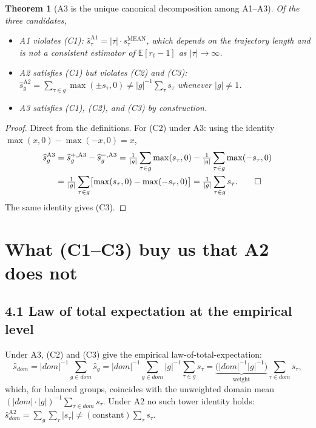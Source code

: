 \documentclass[11pt]{article}
\newcommand{\smean}{s^{\text{MEAN}}}
\newtheorem{theorem}{Theorem}
\begin{document}
\begin{theorem}[A3 is the unique canonical decomposition among A1--A3]
\label{thm:unique}
Of the three candidates,
\begin{itemize}
\item A1 violates (C1): $\widehat s_\tau^{\text{A1}} = |\tau|\cdot\smean_\tau$,
which depends on the trajectory length and is not a consistent estimator
of $\mathbb{E}[r_t-1]$ as $|\tau|\to\infty$.
\item A2 satisfies (C1) but violates (C2) and (C3):
$\widehat s_g^{\text{A2}} = \sum_{\tau\in g}\max(\pm s_\tau,0) \neq |g|^{-1}\sum_\tau s_\tau$
whenever $|g|\neq 1$.
\item A3 satisfies (C1), (C2), and (C3) by construction.
\end{itemize}
\end{theorem}

\begin{proof}
Direct from the definitions. For (C2) under A3: using the identity
$\max(x,0)-\max(-x,0)=x$,
\begin{align*}
\widehat s_g^{\text{A3}} &= \widehat s_g^{+,\text{A3}} - \widehat s_g^{-,\text{A3}}
= \tfrac{1}{|g|}\sum_{\tau\in g}\max(s_\tau,0) - \tfrac{1}{|g|}\sum_{\tau\in g}\max(-s_\tau,0) \\
&= \tfrac{1}{|g|}\sum_{\tau\in g}\bigl[\max(s_\tau,0) - \max(-s_\tau,0)\bigr]
= \tfrac{1}{|g|}\sum_{\tau\in g}s_\tau. \qed
\end{align*}
The same identity gives (C3).
\end{proof}

\section{What (C1--C3) buy us that A2 does not}

\subsection*{4.1 Law of total expectation at the empirical level}

Under A3, (C2) and (C3) give the empirical law-of-total-expectation:
\[
\widehat s_{dom}
= |dom|^{-1}\sum_{g\in dom}\widehat s_g
= |dom|^{-1}\sum_{g\in dom}|g|^{-1}\sum_{\tau\in g}s_\tau
= \underbrace{\bigl(|dom|^{-1}|g|^{-1}\bigr)}_{\text{weight}}\sum_{\tau\in dom}s_\tau,
\]
which, for balanced groups, coincides with the unweighted domain mean
$(|dom|\cdot|g|)^{-1}\sum_{\tau\in dom}s_\tau$. Under A2 no such tower
identity holds: $\widehat s_{dom}^{\text{A2}} = \sum_g\sum_\tau |s_\tau| \neq (\text{constant})\sum_\tau s_\tau$.
\end{document}
